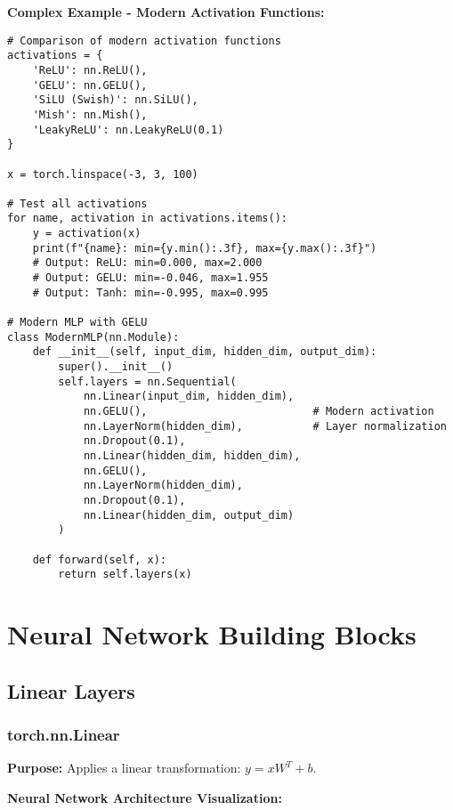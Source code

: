 \documentclass[11pt,a4paper]{book}
\begin{document}
\textbf{Complex Example - Modern Activation Functions:}
\begin{verbatim}
# Comparison of modern activation functions
activations = {
    'ReLU': nn.ReLU(),
    'GELU': nn.GELU(),
    'SiLU (Swish)': nn.SiLU(),
    'Mish': nn.Mish(),
    'LeakyReLU': nn.LeakyReLU(0.1)
}

x = torch.linspace(-3, 3, 100)

# Test all activations
for name, activation in activations.items():
    y = activation(x)
    print(f"{name}: min={y.min():.3f}, max={y.max():.3f}")
    # Output: ReLU: min=0.000, max=2.000
    # Output: GELU: min=-0.046, max=1.955
    # Output: Tanh: min=-0.995, max=0.995

# Modern MLP with GELU
class ModernMLP(nn.Module):
    def __init__(self, input_dim, hidden_dim, output_dim):
        super().__init__()
        self.layers = nn.Sequential(
            nn.Linear(input_dim, hidden_dim),
            nn.GELU(),                          # Modern activation
            nn.LayerNorm(hidden_dim),           # Layer normalization
            nn.Dropout(0.1),
            nn.Linear(hidden_dim, hidden_dim),
            nn.GELU(),
            nn.LayerNorm(hidden_dim),
            nn.Dropout(0.1),
            nn.Linear(hidden_dim, output_dim)
        )
    
    def forward(self, x):
        return self.layers(x)
\end{verbatim}

\chapter{Neural Network Building Blocks}

\section{Linear Layers}

\subsection{torch.nn.Linear}

\textbf{Purpose:} Applies a linear transformation: $y = xW^T + b$.

\textbf{Neural Network Architecture Visualization:}
\end{document}
